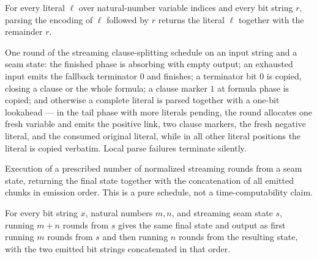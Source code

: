 \begin{lemma}
\label{Complexity.satStream_parseLit}
\leanok
{}
For every literal $\ell$ over natural-number variable indices and every bit string $r$,
parsing the encoding of $\ell$ followed by $r$ returns the literal $\ell$ together with
the remainder $r$.
\end{lemma}

\begin{definition}
\label{Complexity.satStreamRound}
\leanok
{}
One round of the streaming clause-splitting schedule on an input string and a seam
state: the finished phase is absorbing with empty output; an exhausted input emits
the fallback terminator $0$ and finishes; a terminator bit $0$ is copied, closing
a clause or the whole formula; a clause marker $1$ at formula phase is copied; and
otherwise a complete literal is parsed together with a one-bit lookahead — in the
tail phase with more literals pending, the round allocates one fresh variable and
emits the positive link, two clause markers, the fresh negative literal, and the
consumed original literal, while in all other literal positions the literal is
copied verbatim. Local parse failures terminate silently.
\end{definition}

\begin{definition}
\label{Complexity.satStreamRun}
\leanok
{}
Execution of a prescribed number of normalized streaming rounds from a seam state,
returning the final state together with the concatenation of all emitted chunks in
emission order. This is a pure schedule, not a time-computability claim.
\end{definition}

\begin{lemma}
\label{Complexity.satStreamRun_add}
\leanok
{}
For every bit string $x$, natural numbers $m,n$, and streaming seam state $s$, running
$m+n$ rounds from $s$ gives the same final state and output as first running $m$ rounds
from $s$ and then running $n$ rounds from the resulting state, with the two emitted bit
strings concatenated in that order.
\end{lemma}

